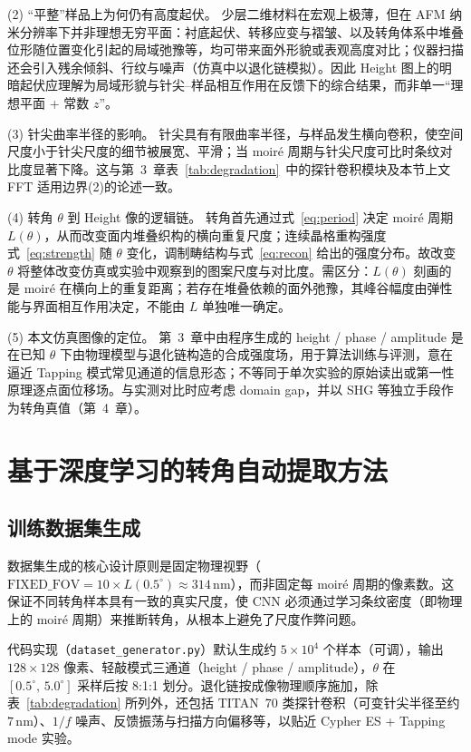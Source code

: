 \documentclass[supercite]{HustGraduPaper}
\begin{document}
(2) ``平整''样品上为何仍有高度起伏。
少层二维材料在宏观上极薄，但在 AFM 纳米分辨率下并非理想无穷平面：衬底起伏、转移应变与褶皱、以及转角体系中堆叠位形随位置变化引起的局域弛豫等，均可带来面外形貌或表观高度对比；仪器扫描还会引入残余倾斜、行纹与噪声（仿真中以退化链模拟）。因此 Height 图上的明暗起伏应理解为局域形貌与针尖--样品相互作用在反馈下的综合结果，而非单一``理想平面 + 常数 $z$''。

(3) 针尖曲率半径的影响。
针尖具有有限曲率半径，与样品发生横向卷积，使空间尺度小于针尖尺度的细节被展宽、平滑；当 moiré 周期与针尖尺度可比时条纹对比度显著下降。这与第~3~章表~\ref{tab:degradation}~中的探针卷积模块及本节上文 FFT 适用边界(2)的论述一致。

(4) 转角 $\theta$ 到 Height 像的逻辑链。
转角首先通过式~\eqref{eq:period} 决定 moiré 周期 $L(\theta)$，从而改变面内堆叠织构的横向重复尺度；连续晶格重构强度式~\eqref{eq:strength} 随 $\theta$ 变化，调制畴结构与式~\eqref{eq:recon} 给出的强度分布。故改变 $\theta$ 将整体改变仿真或实验中观察到的图案尺度与对比度。需区分：$L(\theta)$ 刻画的是 moiré 在横向上的重复距离；若存在堆叠依赖的面外弛豫，其峰谷幅度由弹性能与界面相互作用决定，不能由 $L$ 单独唯一确定。

(5) 本文仿真图像的定位。
第~3~章中由程序生成的 height / phase / amplitude 是在已知 $\theta$ 下由物理模型与退化链构造的合成强度场，用于算法训练与评测，意在逼近 Tapping 模式常见通道的信息形态；不等同于单次实验的原始读出或第一性原理逐点面位移场。与实测对比时应考虑 domain gap，并以 SHG 等独立手段作为转角真值（第~4~章）。

\section{基于深度学习的转角自动提取方法}

\subsection{训练数据集生成}

数据集生成的核心设计原则是固定物理视野（$\mathrm{FIXED\_FOV} = 10 \times L(0.5^{\circ}) \approx 314\,\mathrm{nm}$），而非固定每 moiré 周期的像素数。这保证不同转角样本具有一致的真实尺度，使 CNN 必须通过学习条纹密度（即物理上的 moiré 周期）来推断转角，从根本上避免了尺度作弊问题。

代码实现（\texttt{dataset\_generator.py}）默认生成约 $5\times10^4$ 个样本（可调），输出 $128{\times}128$ 像素、轻敲模式三通道（height / phase / amplitude），$\theta$ 在 $[0.5^{\circ},\,5.0^{\circ}]$ 采样后按 8:1:1 划分。退化链按成像物理顺序施加，除表~\ref{tab:degradation} 所列外，还包括 TITAN~70 类探针卷积（可变针尖半径至约 $7\,\mathrm{nm}$）、$1/f$ 噪声、反馈振荡与扫描方向偏移等，以贴近 Cypher ES + Tapping mode 实验。
\end{document}
